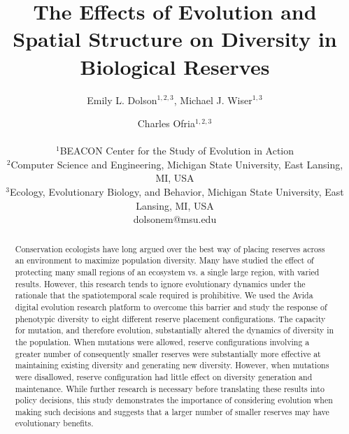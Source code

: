 \documentclass[letterpaper]{article}
\title{The Effects of Evolution and Spatial Structure on Diversity in Biological Reserves}
\author{Emily L. Dolson$^{1,2,3}$, Michael J. Wiser$^{1,3}$ \and Charles Ofria$^{1,2,3}$ \\
\mbox{}\\
$^1$BEACON Center for the Study of Evolution in Action  \\
$^2$Computer Science and Engineering, Michigan State University, East Lansing, MI, USA \\
$^3$Ecology, Evolutionary Biology, and Behavior, Michigan State University, East Lansing, MI, USA\\
dolsonem@msu.edu}
\begin{document}
\maketitle
\begin{abstract}
Conservation ecologists have long argued over the best way of placing reserves across an environment to maximize population diversity. Many have studied the effect of protecting many small regions of an ecosystem vs. a single large region, with varied results. However, this research tends to ignore evolutionary dynamics under the rationale that the spatiotemporal scale required is prohibitive. We used the Avida digital evolution research platform to overcome this barrier and study the response of phenotypic diversity to eight different reserve placement configurations. The capacity for mutation, and therefore evolution, substantially altered the dynamics of diversity in the population. When mutations were allowed, reserve configurations involving a greater number of consequently smaller reserves were substantially more effective at maintaining existing diversity and generating new diversity. However, when mutations were disallowed, reserve configuration had little effect on diversity generation and maintenance. While further research is necessary before translating these results into policy decisions, this study demonstrates the importance of considering evolution when making such decisions and suggests that a larger number of smaller reserves may have evolutionary benefits.
%
%
%
%
%
%
%
%
%
%
%
%
%
\end{abstract}
\end{document}
